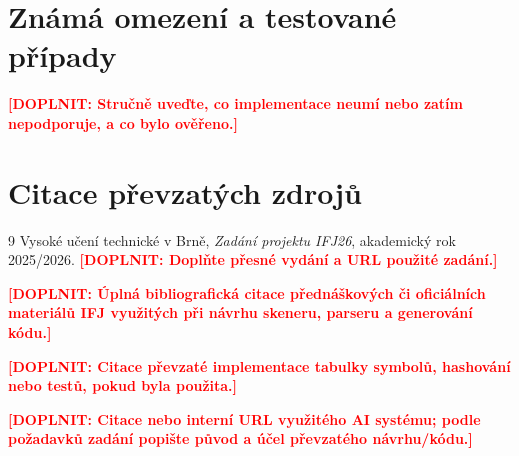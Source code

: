 \documentclass[11pt,a4paper]{article}
\newcommand{\placeholder}[1]{\textcolor{red}{\textbf{[DOPLNIT: #1]}}}
\begin{document}
\section{Známá omezení a testované případy}
\placeholder{Stručně uveďte, co implementace neumí nebo zatím nepodporuje, a co bylo ověřeno.}

\section{Citace převzatých zdrojů}
\begin{thebibliography}{9}
Vysoké učení technické v Brně, \textit{Zadání projektu IFJ26}, akademický rok 2025/2026.
\placeholder{Doplňte přesné vydání a URL použité zadání.}

\placeholder{Úplná bibliografická citace přednáškových či oficiálních materiálů IFJ využitých při návrhu skeneru, parseru a generování kódu.}

\placeholder{Citace převzaté implementace tabulky symbolů, hashování nebo testů, pokud byla použita.}

\placeholder{Citace nebo interní URL využitého AI systému; podle požadavků zadání popište původ a účel převzatého návrhu/kódu.}
\end{thebibliography}
\end{document}
